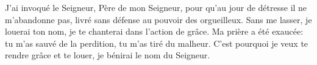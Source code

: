 J’ai invoqué le Seigneur, Père de mon Seigneur,
	pour qu’au jour de détresse il ne m’abandonne pas,
	livré sans défense au pouvoir des orgueilleux.
Sans me lasser, je louerai ton nom,
	je te chanterai dans l’action de grâce.
Ma prière a été exaucée:
	tu m’as sauvé de la perdition, tu m’as tiré du malheur.
C’est pourquoi je veux te rendre grâce et te louer,
	je bénirai le nom du Seigneur.
